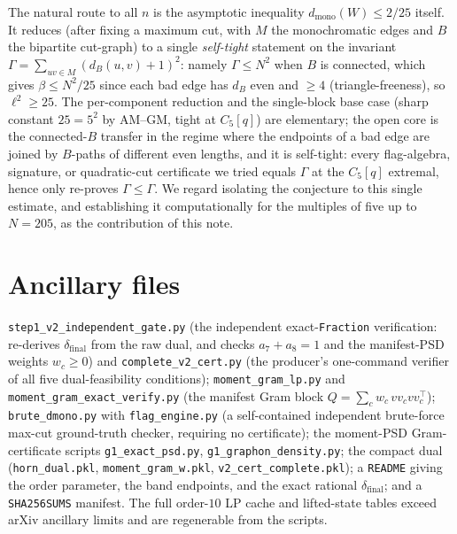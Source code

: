 \documentclass[11pt]{article}
\theoremstyle{remark}
\newcommand{\bip}{\beta}
\newcommand{\dmono}{d_{\mathrm{mono}}}
\begin{document}
The natural route to all $n$ is the asymptotic inequality $\dmono(W)\le 2/25$
itself. It reduces (after fixing a maximum cut, with $M$ the monochromatic edges
and $B$ the bipartite cut-graph) to a single \emph{self-tight} statement on the
invariant $\Gamma=\sum_{uv\in M}(d_B(u,v)+1)^2$: namely $\Gamma\le N^2$ when $B$ is
connected, which gives $\bip\le N^2/25$ since each bad edge has $d_B$ even and
$\ge 4$ (triangle-freeness), so $\ell^2\ge 25$. The per-component reduction and the
single-block base case (sharp constant $25=5^2$ by AM--GM, tight at $C_5[q]$) are
elementary; the open core is the connected-$B$ transfer in the regime where the
endpoints of a bad edge are joined by $B$-paths of different even lengths, and it is
self-tight: every flag-algebra, signature, or quadratic-cut certificate we tried
equals $\Gamma$ at the $C_5[q]$ extremal, hence only re-proves $\Gamma\le\Gamma$.
We regard isolating the conjecture to this single estimate, and establishing it
computationally for the multiples of five up to $N=205$, as the contribution of this
note.

\section*{Ancillary files}

\texttt{step1\_v2\_independent\_gate.py} (the independent exact-\texttt{Fraction}
verification: re-derives $\delta_{\mathrm{final}}$ from the raw dual, and checks
$a_7+a_8=1$ and the manifest-PSD weights $w_c\ge0$) and \texttt{complete\_v2\_cert.py}
(the producer's one-command verifier of all five dual-feasibility conditions);
\texttt{moment\_gram\_lp.py} and \texttt{moment\_gram\_exact\_verify.py} (the manifest
Gram block $Q=\sum_c w_c\,vv_c vv_c^\top$); \texttt{brute\_dmono.py} with
\texttt{flag\_engine.py} (a self-contained independent brute-force max-cut
ground-truth checker, requiring no certificate); the moment-PSD Gram-certificate
scripts \texttt{g1\_exact\_psd.py}, \texttt{g1\_graphon\_density.py}; the compact dual
(\texttt{horn\_dual.pkl}, \texttt{moment\_gram\_w.pkl}, \texttt{v2\_cert\_complete.pkl});
a \texttt{README} giving the order parameter, the band endpoints, and the exact
rational $\delta_{\mathrm{final}}$; and a \texttt{SHA256SUMS} manifest. The full
order-$10$ LP cache and lifted-state tables exceed arXiv ancillary limits and are
regenerable from the scripts.
\end{document}
